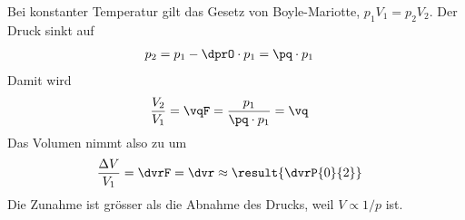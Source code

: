 Bei konstanter Temperatur gilt das Gesetz von Boyle-Mariotte, $p_1V_1 = p_2V_2$. Der Druck sinkt auf
\begin{align}
 p_2 &= p_1 - \dprO\cdot p_1 = \pq\cdot p_1
\end{align}
Damit wird
\begin{align}
 \frac{V_2}{V_1} &= \vqF = \frac{p_1}{\pq\cdot p_1} = \vq
\end{align}
Das Volumen nimmt also zu um
\begin{align}
 \frac{\Delta V}{V_1} &= \dvrF = \dvr \approx \result{\dvrP{0}{2}}
\end{align}
Die Zunahme ist grösser als die Abnahme des Drucks, weil $V \propto 1/p$ ist.
